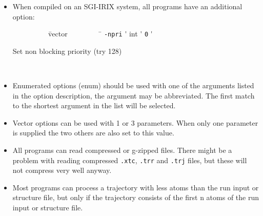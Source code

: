\begin{itemize}
\item
When compiled on an SGI-IRIX system, all {\gromacs} programs have an
additional option:\\
\vspace{-5ex}
\begin{tabbing}
{\tt ~~~~~~~~~} \= vector \= {\tt ~~~~~~~~} \= \kill
\> {\tt -npri} \'\> int \'\> {\tt 0} \' \parbox[t]{0.7\linewidth}{Set non blocking priority (try 128)}\\
\end{tabbing}
\vspace{-5ex}

\item
Enumerated options (enum) should be used with one of the arguments
listed in the option description, the argument may be abbreviated.
The first match to the shortest argument in the list will be selected.

\item
Vector options can be used with 1 or 3 parameters. When only one
parameter is supplied the two others are also set to this value.

\item
All {\gromacs} programs can read compressed or g-zipped files. There
might be a problem with reading compressed {\tt .xtc},
{\tt .trr} and {\tt .trj} files, but these will not compress
very well anyway.

\item
Most {\gromacs} programs can process a trajectory with less atoms than
the run input or structure file, but only if the trajectory consists
of the first n atoms of the run input or structure file.
\end{itemize}

\section{}

